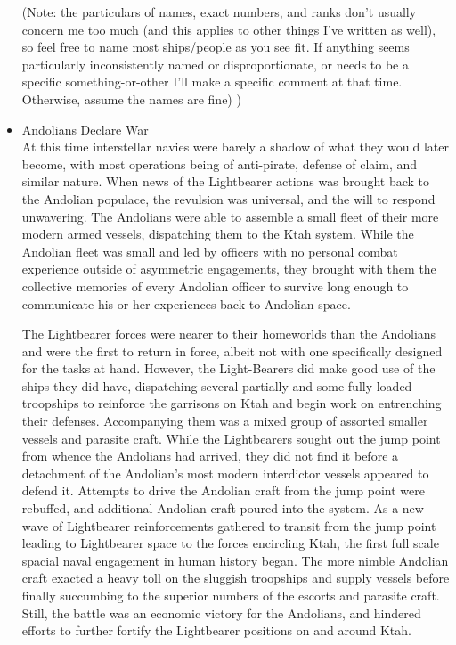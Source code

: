 \begin{itemize}
(Note: the particulars of names, exact numbers, and ranks don't
usually concern me too much (and this applies to other things I've written
as well), so feel free to name most ships/people as you see fit. If
anything seems particularly inconsistently named or disproportionate,
or needs to be a specific something-or-other I'll make a specific
comment at that time. Otherwise, assume the names are fine) )

\item Andolians Declare War \\
	
At this time interstellar navies were barely a shadow of what they
would later become, with most operations being of anti-pirate, defense
of claim, and similar nature.  When news of the Lightbearer actions
was brought back to the Andolian populace, the revulsion was
universal, and the will to respond unwavering. The Andolians were able
to assemble a small fleet of their more modern armed vessels,
dispatching them to the Ktah system.  While the Andolian fleet was
small and led by officers with no personal combat experience outside
of asymmetric engagements, they brought with them the collective
memories of every Andolian officer to survive long enough to
communicate his or her experiences back to Andolian space.  

The Lightbearer forces were nearer to their homeworlds than the
Andolians and were the first to return in force, albeit not with one
specifically designed for the tasks at hand. However, the
Light-Bearers did make good use of the ships they did have,
dispatching several partially and some fully loaded troopships to
reinforce the garrisons on Ktah and begin work on entrenching their
defenses. Accompanying them was a mixed group of assorted smaller
vessels and parasite craft. While the Lightbearers sought out the jump
point from whence the Andolians had arrived, they did not find it
before a detachment of the Andolian's most modern interdictor vessels
appeared to defend it. Attempts to drive the Andolian craft from the
jump point were rebuffed, and additional Andolian craft poured into
the system. As a new wave of Lightbearer reinforcements gathered to
transit from the jump point leading to Lightbearer space to the forces
encircling Ktah, the first full scale spacial naval engagement in
human history began. The more nimble Andolian craft exacted a heavy
toll on the sluggish troopships and supply vessels before finally
succumbing to the superior numbers of the escorts and parasite
craft. Still, the battle was an economic victory for the Andolians,
and hindered efforts to further fortify the Lightbearer positions on
and around Ktah.


\end{itemize}
